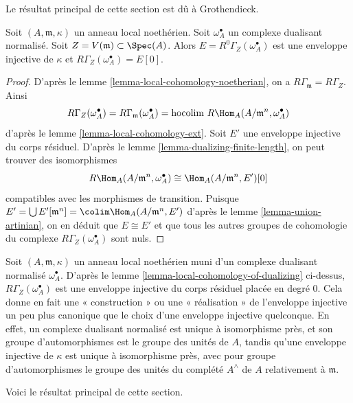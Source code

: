 \noindent
Le résultat principal de cette section est dû à Grothendieck.

\begin{lemma}
\label{lemma-local-cohomology-of-dualizing}
Soit $(A, \mathfrak m, \kappa)$ un anneau local noethérien.
Soit $\omega_A^\bullet$ un complexe dualisant normalisé.
Soit $Z = V(\mathfrak m) \subset \Spec(A)$.
Alors $E = R^0\Gamma_Z(\omega_A^\bullet)$ est une enveloppe injective de $\kappa$ et $R\Gamma_Z(\omega_A^\bullet) = E[0]$.
\end{lemma}

\begin{proof}
D'après le lemme \ref{lemma-local-cohomology-noetherian}, on a $R\Gamma_{\mathfrak m} = R\Gamma_Z$. Ainsi
$$
R\Gamma_Z(\omega_A^\bullet) =
R\Gamma_{\mathfrak m}(\omega_A^\bullet) =
\text{hocolim}\ R\Hom_A(A/\mathfrak m^n, \omega_A^\bullet)
$$
d'après le lemme \ref{lemma-local-cohomology-ext}. Soit $E'$ une enveloppe injective du corps résiduel.
D'après le lemme \ref{lemma-dualizing-finite-length}, on peut trouver des isomorphismes
$$
R\Hom_A(A/\mathfrak m^n, \omega_A^\bullet) \cong \Hom_A(A/\mathfrak m^n, E')[0]
$$
compatibles avec les morphismes de transition. Puisque
$E' = \bigcup E'[\mathfrak m^n] = \colim \Hom_A(A/\mathfrak m^n, E')$
d'après le lemme \ref{lemma-union-artinian}, on en déduit que $E \cong E'$
et que tous les autres groupes de cohomologie du complexe $R\Gamma_Z(\omega_A^\bullet)$ sont nuls.
\end{proof}

\begin{remark}
\label{remark-specific-injective-hull}
Soit $(A, \mathfrak m, \kappa)$ un anneau local noethérien muni d'un complexe dualisant normalisé $\omega_A^\bullet$.
D'après le lemme \ref{lemma-local-cohomology-of-dualizing} ci-dessus, $R\Gamma_Z(\omega_A^\bullet)$ est une enveloppe injective
du corps résiduel placée en degré $0$.
Cela donne en fait une « construction » ou une « réalisation »
de l'enveloppe injective un peu plus canonique que le choix
d'une enveloppe injective quelconque.
En effet, un complexe dualisant normalisé est unique à isomorphisme près,
et son groupe d'automorphismes est le groupe des unités de $A$,
tandis qu'une enveloppe injective de $\kappa$ est unique à isomorphisme près,
avec pour groupe d'automorphismes le groupe des unités du complété
$A^\wedge$ de $A$ relativement à $\mathfrak m$.
\end{remark}

\noindent
Voici le résultat principal de cette section.

